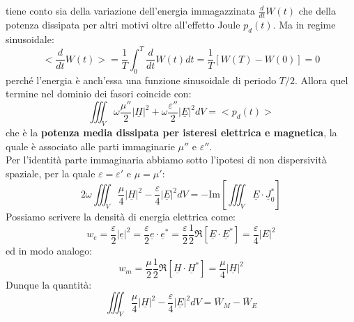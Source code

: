 \documentclass{book}
\begin{document}
        tiene conto sia della variazione dell'energia immagazzinata $\frac{d}{dt}W(t)$ che della potenza dissipata per altri motivi
        oltre all'effetto Joule $p_{d}(t)$. Ma in regime sinusoidale:
        \begin{equation}
            <\frac{d}{dt}W(t)> = \frac{1}{T} \int_{0} ^{T} \frac{d}{dt}W(t)dt = \frac{1}{T}[W(T)-W(0)] = 0
        \end{equation}
        perché l'energia è anch'essa una funzione sinusoidale di periodo $T/2$. Allora quel termine nel dominio dei fasori coincide con:
        \begin{equation}
            \iiint_{V} \omega \frac{\mu ''}{2} |\underline{H}|^{2}+\omega \frac{\varepsilon ''}{2}|\underline{E}|^{2}dV = <p_{d}(t)>
        \end{equation}
        che è la \textbf{potenza media dissipata per isteresi elettrica e magnetica}, la quale è associato alle parti immaginarie 
        $\mu ''$ e $\varepsilon ''$. \\
        Per l'identità parte immaginaria abbiamo sotto l'ipotesi di non dispersività spaziale, per la quale $\varepsilon=\varepsilon'$ e $\mu = \mu'$:
        \begin{equation}
            \label{eqn:parte_img_poynting}
            2 \omega \iiint_{V} \frac{\mu}{4}|\underline{H}|^{2}-\frac{\varepsilon}{4}|\underline{E}|^{2}dV = -\text{Im}[\iiint_{V} \underline{E} \cdot \underline{J}_{0} ^{*}]
        \end{equation}
        Possiamo scrivere la densità di energia elettrica come:
        \begin{equation}
                \displaystyle w_{e} = \frac{\varepsilon}{2}|\underline{e}|^{2} = \frac{\varepsilon}{2}\underline{e} \cdot \underline{e}^{*}
                 = \frac{\varepsilon}{2} \frac{1}{2}\Re[\underline{E}\cdot\underline{E}^{*}] = \frac{\varepsilon}{4}|E|^{2}
        \end{equation}
        ed in modo analogo:
        \begin{equation}
            w_{m} = \frac{\mu}{2}\frac{1}{2}\Re[\underline{H} \cdot \underline{H}^{*}] = \frac{\mu}{4}|\underline{H}|^{2}
        \end{equation}
        Dunque la quantità:
        \begin{equation}
            \label{eqn:diff_media_magnetica_elettrica}
            \iiint_{V} \frac{\mu}{4}|\underline{H}|^{2}-\frac{\varepsilon}{4}|\underline{E}|^{2} dV =\overline{W}_{M}-\overline{W}_{E}
        \end{equation}
\end{document}
